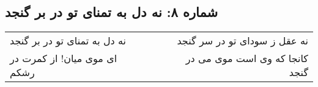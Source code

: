 \begin{center}
\section*{شماره ۸: نه دل به تمنای تو در بر گنجد}
\label{sec:008}
\begin{longtable}{l p{0.5cm} r}
نه دل به تمنای تو در بر گنجد
&&
نه عقل ز سودای تو در سر گنجد
\\
ای موی میان! از کمرت در رشکم
&&
کانجا که وی است موی می در گنجد
\\
\end{longtable}
\end{center}
